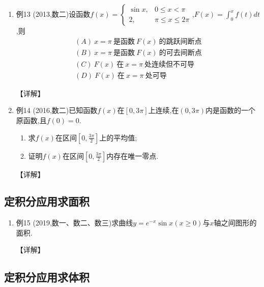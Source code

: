 \documentclass[12pt, a4paper, oneside, UTF8]{ctexbook}
\begin{document}
\begin{enumerate}[label=\arabic*.,start=12]
    \item 例13 (2013,数二)设函数$f(x)=\begin{cases}
        \sin x, & 0\leq x<\pi \\
        2, & \pi\leq x\leq 2\pi
    \end{cases}$,$F(x)=\int_0^x f(t) dt$,则
    \begin{align*}
        (A)\ x=\pi\ 是函数\ F(x)\ 的跳跃间断点 \\
        (B)\ x=\pi\ 是函数\ F(x)\ 的可去间断点 \\
        (C)\ F(x)\ 在\ x=\pi\ 处连续但不可导 \\
        (D)\ F(x)\ 在\ x=\pi\ 处可导
    \end{align*}
    
    \begin{solution}
    【详解】
    \end{solution}
    
    \item 例14 (2016,数二)已知函数$f(x)$在$[0,3\pi]$上连续,在$(0,3\pi)$内是函数的一个原函数,且$f(0)=0$.
    \begin{enumerate}[label=(\roman*)]
        \item 求$f(x)$在区间$[0,\frac{3\pi}{2}]$上的平均值;
        \item 证明$f(x)$在区间$[0,\frac{3\pi}{2}]$内存在唯一零点.
    \end{enumerate}
    
    \begin{solution}
    【详解】
    \end{solution}
\end{enumerate}

\subsection{ 定积分应用求面积}

\begin{enumerate}[label=\arabic*.,start=14]
    \item 例15 (2019,数一、数二、数三)求曲线$y=e^{-x}\sin x(x\geq 0)$与$x$轴之间图形的面积.
    
    \begin{solution}
    【详解】
    \end{solution}
\end{enumerate}

\subsection{ 定积分应用求体积}
\end{document}
